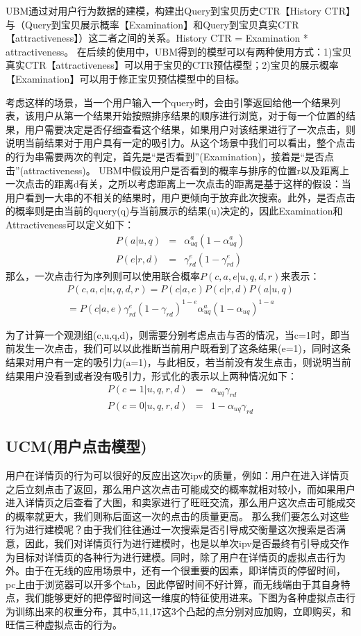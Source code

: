 UBM通过对用户行为数据的建模，构建出Query到宝贝历史CTR【History CTR】与（Query到宝贝展示概率【Examination】和Query到宝贝真实CTR【attractiveness】）这二者之间的关系。History CTR = Examination * attractiveness。
在后续的使用中，UBM得到的模型可以有两种使用方式：1)宝贝真实CTR【attractiveness】可以用于宝贝的CTR预估模型；2)宝贝的展示概率【Examination】可以用于修正宝贝预估模型中的目标。

考虑这样的场景，当一个用户输入一个query时，会由引擎返回给他一个结果列表，该用户从第一个结果开始按照排序结果的顺序进行浏览，对于每一个位置的结果，用户需要决定是否仔细查看这个结果，如果用户对该结果进行了一次点击，则说明当前结果对于用户具有一定的吸引力。从这个场景中我们可以看出，整个点击的行为串需要两次的判定，首先是“是否看到”(Examination)，接着是“是否点击”(attractiveness)。
UBM中假设用户是否看到的概率与排序的位置r以及距离上一次点击的距离d有关，之所以考虑距离上一次点击的距离是基于这样的假设：当用户看到一大串的不相关的结果时，用户更倾向于放弃此次搜索。此外，是否点击的概率则是由当前的query(q)与当前展示的结果(u)决定的，因此Examination和Attractiveness可以定义如下：
\begin{eqnarray}
P(a|u,q) &=& \alpha_{uq}^a(1-\alpha_{uq}^a)
\\
P(e|r,d) &=& \gamma_{rd}^e(1-\gamma_{rd}^e)
\end{eqnarray}
那么，一次点击行为序列则可以使用联合概率$P(c,a,e|u,q,d,r)$来表示：
\begin{equation}
\begin{aligned}
P(c,a,e|u,q,d,r) = P(c|a,e)P(e|r,d)P(a|u,q) \\
= P(c|a,e)\gamma_{rd}^e(1-\gamma_{rd})^{1-e}\alpha_{uq}^a(1-\alpha_{uq})^{1-a}
\end{aligned}
\end{equation}

为了计算一个观测组(c,u,q,d)，则需要分别考虑点击与否的情况，当c=1时，即当前发生一次点击，我们可以以此推断当前用户既看到了这条结果(e=1)，同时这条结果对用户有一定的吸引力(a=1)，与此相反，若当前没有发生点击，则说明当前结果用户没看到或者没有吸引力，形式化的表示以上两种情况如下：
\begin{eqnarray}
P(c=1|u,q,r,d) &=& \alpha_{uq}\gamma_{rd}
\\
P(c=0|u,q,r,d) &=& 1 - \alpha_{uq}\gamma_{rd}
\end{eqnarray}
\subsection{UCM(用户点击模型)}
用户在详情页的行为可以很好的反应出这次ipv的质量，例如：用户在进入详情页之后立刻点击了返回，那么用户这次点击可能成交的概率就相对较小，而如果用户进入详情页之后查看了大图，和卖家进行了旺旺交流，那么用户这次点击可能成交的概率就更大，我们则称后面这一次的点击的质量更高。
那么我们要怎么对这些行为进行建模呢？由于我们往往通过一次搜索是否引导成交衡量这次搜索是否满意，因此，我们对详情页行为进行建模时，也是以单次ipv是否最终有引导成交作为目标对详情页的各种行为进行建模。同时，除了用户在详情页的虚拟点击行为外。由于在无线的应用场景中，还有一个很重要的因素，即详情页的停留时间，pc上由于浏览器可以开多个tab，因此停留时间不好计算，而无线端由于其自身特点，我们能够更好的把停留时间这一维度的特征使用进来。下图为各种虚拟点击行为训练出来的权重分布，其中5,11,17这3个凸起的点分别对应加购，立即购买，和旺信三种虚拟点击的行为。 


